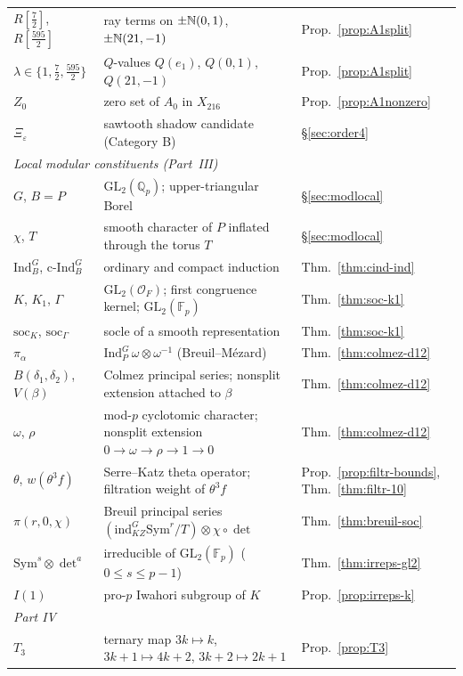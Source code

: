 \begin{center}
\begin{longtable}{p{3.2cm}p{9.3cm}p{2.4cm}}
$R[\frac72]$, $R[\frac{595}2]$ & ray terms on $\pm\mathbb{N}(0,1)$, $\pm\mathbb{N}(21,-1)$ & Prop.~\ref{prop:A1split}\\
$\lambda\in\{1,\frac72,\frac{595}2\}$ & $Q$-values $Q(e_1)$, $Q(0,1)$, $Q(21,-1)$ & Prop.~\ref{prop:A1split}\\
$Z_0$ & zero set of $A_0$ in $X_{216}$ & Prop.~\ref{prop:A1nonzero}\\
$\Xi_\varepsilon$ & sawtooth shadow candidate (Category B) & \S\ref{sec:order4}\\
\multicolumn{3}{l}{\emph{Local modular constituents (Part~III)}}\\
$G$, $B=P$ & $\mathrm{GL}_2(\mathbb{Q}_p)$; upper-triangular Borel & \S\ref{sec:modlocal}\\
$\chi$, $T$ & smooth character of $P$ inflated through the torus $T$ & \S\ref{sec:modlocal}\\
$\mathrm{Ind}_B^G$, $\mathrm{c\text{-}Ind}_B^G$ & ordinary and compact induction & Thm.~\ref{thm:cind-ind}\\
$K$, $K_1$, $\Gamma$ & $\mathrm{GL}_2(\mathcal{O}_F)$; first congruence kernel; $\mathrm{GL}_2(\mathbb{F}_p)$ & Thm.~\ref{thm:soc-k1}\\
$\mathrm{soc}_K$, $\mathrm{soc}_\Gamma$ & socle of a smooth representation & Thm.~\ref{thm:soc-k1}\\
$\pi_\alpha$ & $\mathrm{Ind}_P^G\,\omega\otimes\omega^{-1}$ (Breuil--M\'ezard) & Thm.~\ref{thm:colmez-d12}\\
$B(\delta_1,\delta_2)$, $V(\beta)$ & Colmez principal series; nonsplit extension attached to $\beta$ & Thm.~\ref{thm:colmez-d12}\\
$\omega$, $\rho$ & mod-$p$ cyclotomic character; nonsplit extension $0\to\omega\to\rho\to1\to0$ & Thm.~\ref{thm:colmez-d12}\\
$\theta$, $w(\theta^3 f)$ & Serre--Katz theta operator; filtration weight of $\theta^3 f$ & Prop.~\ref{prop:filtr-bounds}, Thm.~\ref{thm:filtr-10}\\
$\pi(r,0,\chi)$ & Breuil principal series $(\mathrm{ind}_{KZ}^G\mathrm{Sym}^r/T)\otimes\chi\circ\det$ & Thm.~\ref{thm:breuil-soc}\\
$\mathrm{Sym}^s\otimes\det^a$ & irreducible of $\mathrm{GL}_2(\mathbb{F}_p)$ ($0\le s\le p-1$) & Thm.~\ref{thm:irreps-gl2}\\
$I(1)$ & pro-$p$ Iwahori subgroup of $K$ & Prop.~\ref{prop:irreps-k}\\
\multicolumn{3}{l}{\emph{Part IV}}\\
$T_3$ & ternary map $3k\mapsto k$, $3k{+}1\mapsto4k{+}2$, $3k{+}2\mapsto2k{+}1$ & Prop.~\ref{prop:T3}\\

\end{longtable}
\end{center}
